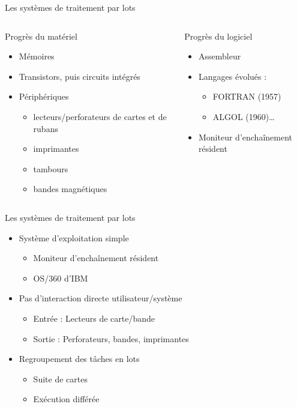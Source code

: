 \begin{frame}{Les systèmes de traitement par lots}
\begin{columns}
\begin{block}{Progrès du matériel}
\begin{itemize}
\item Mémoires
\item Transistors, puis circuits intégrés
\item Périphériques
\begin{itemize}
\item lecteurs/perforateurs de cartes et de rubans
\item imprimantes
\item tambours
\item bandes magnétiques
\end{itemize}
\end{itemize}
\end{block}
\begin{block}{Progrès du logiciel}
\begin{itemize}
\item Assembleur
\item Langages évolués :
\begin{itemize}
\item FORTRAN (1957)
\item ALGOL (1960)…
\end{itemize}
\item Moniteur d’enchaînement résident
\end{itemize}
\end{block}
\end{columns}
\end{frame}

\begin{frame}{Les systèmes de traitement par lots}
\begin{itemize}
\item Système d'exploitation simple 
\begin{itemize}
\item Moniteur d’enchaînement résident
\item OS/360 d’IBM
\end{itemize}
\item Pas d'interaction directe utilisateur/système
\begin{itemize}
\item Entrée : Lecteurs de carte/bande
\item Sortie : Perforateurs, bandes, imprimantes
\end{itemize}
\item Regroupement des tâches en lots
\begin{itemize}
\item Suite de cartes
\item Exécution différée
\end{itemize}
\end{itemize}
\end{frame}

